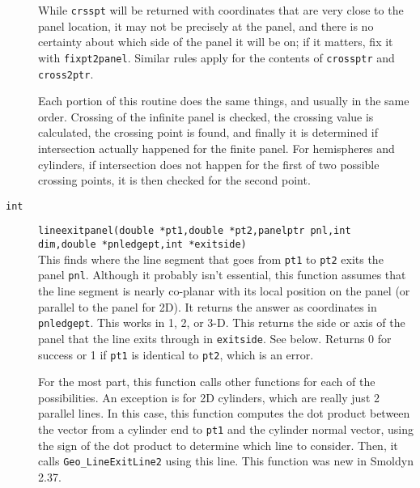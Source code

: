 \documentclass {scrbook}
\newcommand {\ttt} {\texttt}
\begin{document}
\begin{description}
While \ttt{crsspt} will be returned with coordinates that are very close to the panel location, it may not be precisely at the panel, and there is no certainty about which side of the panel it will be on; if it matters, fix it with \ttt{fixpt2panel}. Similar rules apply for the contents of \ttt{crossptr} and \ttt{cross2ptr}.

Each portion of this routine does the same things, and usually in the same order. Crossing of the infinite panel is checked, the crossing value is calculated, the crossing point is found, and finally it is determined if intersection actually happened for the finite panel. For hemispheres and cylinders, if intersection does not happen for the first of two possible crossing points, it is then checked for the second point.

\item[\ttt{int}]
\ttt{lineexitpanel(double *pt1,double *pt2,panelptr pnl,int dim,double *pnledgept,int *exitside)}
\hfill \\
This finds where the line segment that goes from \ttt{pt1} to \ttt{pt2} exits the panel \ttt{pnl}. Although it probably isn't essential, this function assumes that the line segment is nearly co-planar with its local position on the panel (or parallel to the panel for 2D). It returns the answer as coordinates in \ttt{pnledgept}. This works in 1, 2, or 3-D. This returns the side or axis of the panel that the line exits through in \ttt{exitside}. See below. Returns 0 for success or 1 if \ttt{pt1} is identical to \ttt{pt2}, which is an error.

For the most part, this function calls other functions for each of the possibilities. An exception is for 2D cylinders, which are really just 2 parallel lines. In this case, this function computes the dot product between the vector from a cylinder end to \ttt{pt1} and the cylinder normal vector, using the sign of the dot product to determine which line to consider. Then, it calls \ttt{Geo\_LineExitLine2} using this line. This function was new in Smoldyn 2.37.


\end{description}
\end{document}
